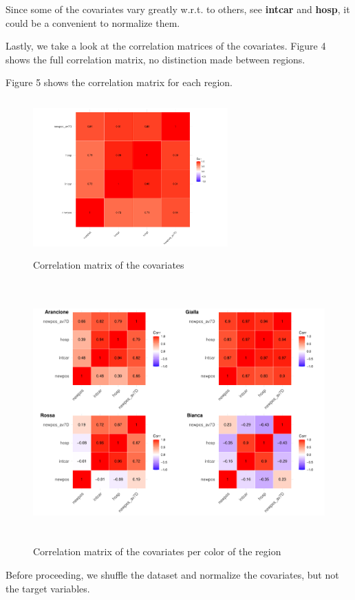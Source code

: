 \documentclass[12pt,a4paper]{article}
\theoremstyle{definition}
\theoremstyle{remark}
\begin{document}
    Since some of the covariates vary greatly w.r.t. to others, see \textbf{intcar} and \textbf{hosp}, it could be a convenient to normalize them. 

Lastly, we take a look at the correlation matrices of the covariates. Figure 4 shows the full correlation matrix, no distinction made between regions. 

Figure 5 shows the correlation matrix for each region.
    
\begin{figure}[htb!]
	\centering
	\includegraphics[width=75mm, height=60mm,scale=0.5]{corrmatrix.pdf}
	\caption{Correlation matrix of the covariates}
\end{figure}
\begin{figure}[htb!]
	\centering
	\includegraphics[width=130mm, height=100mm,scale=0.5]{corrmat2.pdf}
	\caption{Correlation matrix of the covariates per color of the region}
\end{figure}


Before proceeding, we shuffle the dataset and normalize the covariates, but not the target variables.
\end{document}
